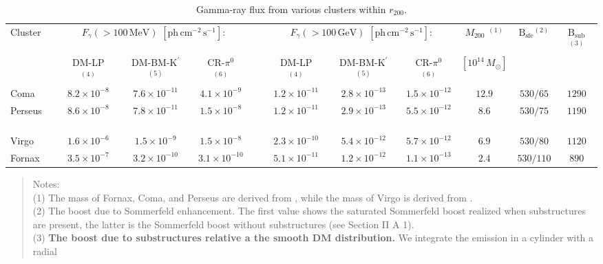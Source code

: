 \documentclass[10pt,aps,pra,reprint,amsmath,amsfonts,amssymb,showpacs,nofootinbib,floatfix]{revtex4-1}
\def\C#1{{\bf #1}}
\newcommand{\rmn}{\mathrm}
\newcommand{\msun}{M_\odot}
\newcommand{\Kp}{\rmn{K}^\prime}
\newcommand{\B}{\rmn{B}}
\newcommand{\rvir}{r_{200}}
\newcommand{\mvir}{M_{200}}
\begin{document}
\begin{table}
\begin{minipage}{2.0\columnwidth}
  \caption{Gamma-ray flux from various clusters within $\rvir$.}
\begin{tabular}{l  c c c  c  c c c c c c}
\hline
\hline
 Cluster &
\multicolumn{3}{c}{$F_{\gamma}(>100\,\rmn{MeV})$ $[\rmn{ph}\,\rmn{cm}^{-2}\,\rmn{s}^{-1}]$:} & &
\multicolumn{3}{c}{$F_{\gamma}(>100\,\rmn{GeV})$ $[\rmn{ph}\,\rmn{cm}^{-2}\,\rmn{s}^{-1}]$:} & 
$\mvir$ $^{(1)}$ & $\B_\rmn{sfe} $$^{(2)}$ &  $\B_\rmn{sub} $$^{(3)}$ \\
         & DM-LP $^{(4)}$ & DM-BM-$\Kp$ $^{(5)}$ & CR-$\pi^0$ $^{(6)}$ 
         & & DM-LP $^{(4)}$ & DM-BM-$\Kp$ $^{(5)}$ & CR-$\pi^0$ $^{(6)}$ & $[10^{14}\,\msun]$ &&  \\
 \hline
 Coma                 & $8.2\times10^{-8}$  & $7.6\times10^{-11}$ & $4.1\times10^{-9}$  
 & \,\,\,\,\,         & $1.2\times10^{-11}$ & $2.8\times10^{-13}$ & $1.5\times10^{-12}$ 
 & $12.9$ & $530/65$  & $1290$ \\
 Perseus \,\,\,\,\,\, & $8.6\times10^{-8}$  & $7.8\times10^{-11}$ & $1.5\times10^{-8}$  
 & \,\,\,\,\,         & $1.2\times10^{-11}$ & $2.9\times10^{-13}$ & $5.5\times10^{-12}$ 
 & $8.6$ & $530/75$  & $1190$ \\
 Virgo                & $1.6\times10^{-6}$  & $1.5\times10^{-9}$ & $1.5\times10^{-8}$  
 & \,\,\,\,\,         & $2.3\times10^{-10}$ & $5.4\times10^{-12}$ & $5.7\times10^{-12}$ 
 & $6.9$  & $530/80$  & $1120$  \\
 Fornax               & $3.5\times10^{-7}$  & $3.2\times10^{-10}$ & $3.1\times10^{-10}$ 
 & \,\,\,\,\,         & $5.1\times10^{-11}$ & $1.2\times10^{-12}$ & $1.1\times10^{-13}$ 
 & $2.4$  & $530/110$  & $890$  \\
\hline
\hline
\end{tabular}
\begin{quote}
  Notes: \\
  (1) The mass of Fornax, Coma, and Perseus are derived from \cite{2007A&A...466..805C}, 
  while the mass of Virgo is derived from \cite{1984ApJ...281...31T}.\\
  (2) The boost due to Sommerfeld enhancement. The first value shows the saturated 
  Sommerfeld boost realized when substructures are present, the latter is the Sommerfeld 
  boost without substructures (see Section II A 1).\\
  (3) \C{The boost due to substructures relative a the smooth DM
  distribution.} We integrate the emission in a cylinder with a radial

\end{quote}
\end{minipage}
\end{table}
\end{document}
